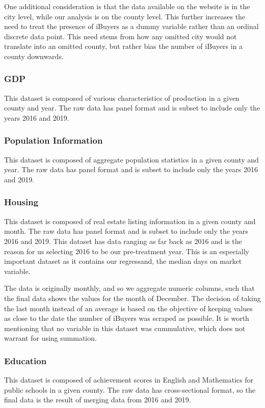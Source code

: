 One additional consideration is that the data available on the website is in the city level, while our analysis is on the county level. This further increases the need to treat the presence of iBuyers as a dummy variable rather than an ordinal discrete data point. This need stems from how any omitted city would not translate into an omitted county, but rather bias the number of iBuyers in a county downwards.

\subsubsection{GDP}
This dataset is composed of various characteristics of production in a given county and year. The raw data has panel format and is subset to include only the years 2016 and 2019.

\subsubsection{Population Information}
This dataset is composed of aggregate population statistics in a given county and year. The raw data has panel format and is subset to include only the years 2016 and 2019.

\subsubsection{Housing}\label{subsubsec_housing}
This dataset is composed of real estate listing information in a  given county and month. The raw data has panel format and is subset to include only the years 2016 and 2019. This dataset has data ranging as far back as 2016 and is the reason for us selecting 2016 to be our pre-treatment year. This is an especially important dataset as it contains our regressand, the median days on market variable. 

The data is originally monthly, and so we aggregate numeric columns, such that the final data shows the values for the month of December. The decision of taking the last month instead of an average is based on the objective of keeping values as close to the date the number of iBuyers was scraped as possible. It is worth mentioning that no variable in this dataset was cummulative, which does not warrant for using summation.

\subsubsection{Education}
This dataset is composed of achievement scores in English and Mathematics for public schools in a given county. The raw data has cross-sectional format, so the final data is the result of merging data from 2016 and 2019. 


